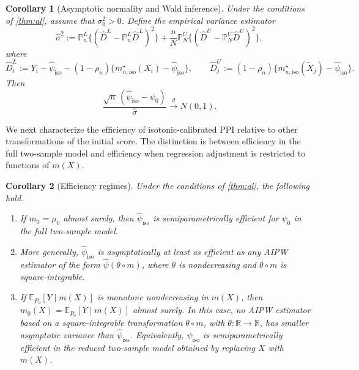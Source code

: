 \documentclass{article}
\theoremstyle{plain}
\newtheorem{corollary}{Corollary}
\theoremstyle{definition}
\newcommand{\E}{\mathbb{E}}
\newcommand{\1}{\mathbbm{1}}
\newcommand{\mhat}{m}
\newcommand{\rhon}{\rho_n}
\newcommand{\muzero}{\mu_0}
\newcommand{\Pl}{\mathbb{P}^{L}_n}
\newcommand{\Pu}{\mathbb{P}^{U}_N}
\begin{document}
\begin{corollary}[Asymptotic normality and Wald inference]
\label{cor:normal}
Under the conditions of \cref{thm:al}, assume that
$\sigma_0^2>0$. Define the empirical variance estimator
\[
\widehat \sigma^2
:=
\Pl\{(\widehat D^L-\Pl\widehat D^L)^2\}
+
\frac{n}{N}\Pu\{(\widehat D^U-\Pu\widehat D^U)^2\},
\]
where
\[
\widehat D_i^L
:=
Y_i-\widehat{\psi}_{\mathrm{iso}}
-(1-\rhon)\{m_{n,\mathrm{iso}}^\star(X_i)-\widehat{\psi}_{\mathrm{iso}}\},
\qquad
\widehat D_j^U
:=
(1-\rhon)\{m_{n,\mathrm{iso}}^\star(\widetilde X_j)-\widehat{\psi}_{\mathrm{iso}}\}.
\]
Then
\[
\frac{\sqrt n\,(\widehat{\psi}_{\mathrm{iso}}-\psi_0)}
{\widehat\sigma}
\overset{d}{\longrightarrow}
N(0,1).
\]
\end{corollary}

We next characterize the efficiency of isotonic-calibrated
PPI relative to other transformations of the initial score.
The distinction is between efficiency in the full two-sample
model and efficiency when regression adjustment is restricted
to functions of $\mhat(X)$.

\begin{corollary}[Efficiency regimes]
\label{cor:efficiency}
Under the conditions of \cref{thm:al}, the following hold.
\begin{enumerate}[leftmargin=6mm,label=(\roman*)]
\item If $m_0=\muzero$ almost surely, then
$\widehat{\psi}_{\mathrm{iso}}$ is semiparametrically efficient
for $\psi_0$ in the full two-sample model.

\item More generally, $\widehat{\psi}_{\mathrm{iso}}$ is
asymptotically at least as efficient as any AIPW estimator
of the form $\widehat{\psi}(\theta\circ\mhat)$, where
$\theta$ is nondecreasing and $\theta\circ\mhat$ is square-integrable.

\item If $\E_{P_0}[Y\mid \mhat(X)]$ is monotone nondecreasing
in $\mhat(X)$, then
$m_0(X)=\E_{P_0}[Y\mid \mhat(X)]$ almost surely.
In this case, no AIPW estimator based on a square-integrable transformation
$\theta\circ\mhat$, with
$\theta:\mathbb R\to\mathbb R$, has smaller asymptotic
variance than $\widehat{\psi}_{\mathrm{iso}}$.
Equivalently, $\widehat{\psi}_{\mathrm{iso}}$ is
semiparametrically efficient in the reduced two-sample
model obtained by replacing $X$ with $\mhat(X)$.
\end{enumerate}
\end{corollary}
\end{document}
